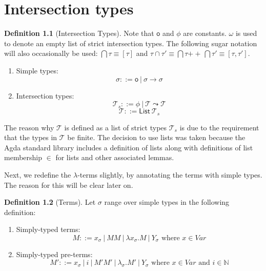 \documentclass[a4paper, 12pt, twoside]{style/ociamthesis}
\theoremstyle{plain}
\theoremstyle{definition}
\newtheorem{Definition}{Definition}[chapter]
\theoremstyle{remark}
\providecommand{\tightlist}{%
  \setlength{\itemsep}{0pt}\setlength{\parskip}{0pt}}
\newcommand{\concat}{\ensuremath{+\!\!\!\!+\,}}
\begin{document}
\newpage

\hypertarget{itypes}{\chapter{Intersection types}\label{itypes}}

\begin{Definition}[Intersection Types]

Note that \(\mathsf{o}\) and \(\phi\) are constants. \(\omega\) is used
to denote an empty list of strict intersection types. The following
sugar notation will also occasionally be used:
\(\bigcap \tau \equiv [ \tau ]\) and
\(\tau \cap \tau' \equiv \bigcap \tau \concat \bigcap \tau' \equiv [ \tau, \tau' ]\).

\begin{enumerate}
\def\labelenumi{\roman{enumi})}
\tightlist
\item
  Simple types: \[\sigma ::= \mathsf{o}\ |\ \sigma \to \sigma\]
\item
  Intersection types:
  \[\mathcal{T}_s ::= \phi\ |\ \mathcal{T} \leadsto \mathcal{T}\]
  \[\mathcal{T} ::= \mathsf{List}\ \mathcal{T}_s\]
\end{enumerate}

\end{Definition}

The reason why \(\mathcal{T}\) is defined as a list of strict types
\(\mathcal{T}_s\) is due to the requirement that the types in
\(\mathcal{T}\) be finite. The decision to use lists was taken because
the Agda standard library includes a definition of lists along with
definitions of list membership \(\in\) for lists and other associated
lemmas.

Next, we redefine the \(\lambda\)-terms slightly, by annotating the
terms with simple types. The reason for this will be clear later on.

\begin{Definition}[Terms]

Let \(\sigma\) range over simple types in the following definition:

\begin{enumerate}
\def\labelenumi{\roman{enumi})}
\tightlist
\item
  Simply-typed terms:
  \[M::= x_\sigma\ |\ MM\ |\ \lambda x_\sigma.M\ |\ Y_\sigma \text{ where }x \in Var\]
\item
  Simply-typed pre-terms:
  \[M'::= x_\sigma\ |\ i\ |\ M'M'\ |\ \lambda_\sigma.M'\ |\ Y_\sigma \text{ where }x \in Var\text{ and }i \in \mathbb{N}\]
\end{enumerate}

\end{Definition}
\end{document}
